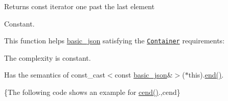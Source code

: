  \begin{DoxyReturn}{Returns}
const iterator one past the last element
\end{DoxyReturn}
Constant.

This function helps {\ttfamily \hyperlink{classnlohmann_1_1basic__json}{basic\-\_\-json}} satisfying the \href{http://en.cppreference.com/w/cpp/concept/Container}{\tt Container} requirements\-:
\begin{DoxyItemize}
\item The complexity is constant.
\item Has the semantics of {\ttfamily const\-\_\-cast$<$const \hyperlink{classnlohmann_1_1basic__json}{basic\-\_\-json}\&$>$($\ast$this).\hyperlink{classnlohmann_1_1basic__json_a12ccf14d39ddae52f6c7e126105a230b}{end()}}.
\end{DoxyItemize}

\{The following code shows an example for {\ttfamily \hyperlink{classnlohmann_1_1basic__json_aa730d68d55ccc48d2cd4835ff46d2a0f}{cend()}}.,cend\}

